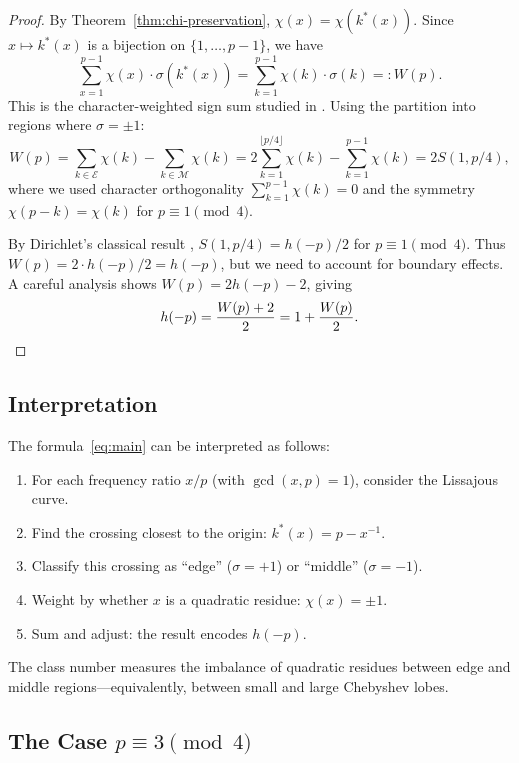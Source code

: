 \documentclass[11pt,a4paper]{article}
\begin{document}
\begin{proof}
By Theorem~\ref{thm:chi-preservation}, $\chi(x) = \chi(k^*(x))$. Since $x \mapsto k^*(x)$ is a bijection on $\{1, \ldots, p-1\}$, we have
\[
\sum_{x=1}^{p-1} \chi(x) \cdot \sigma(k^*(x)) = \sum_{k=1}^{p-1} \chi(k) \cdot \sigma(k) =: W(p).
\]
This is the character-weighted sign sum studied in \cite{Popelka2025sign}. Using the partition into regions where $\sigma = \pm 1$:
\[
W(p) = \sum_{k \in \mathcal{E}} \chi(k) - \sum_{k \in \mathcal{M}} \chi(k) = 2 \sum_{k=1}^{\lfloor p/4 \rfloor} \chi(k) - \sum_{k=1}^{p-1} \chi(k) = 2 S(1, p/4),
\]
where we used character orthogonality $\sum_{k=1}^{p-1} \chi(k) = 0$ and the symmetry $\chi(p-k) = \chi(k)$ for $p \equiv 1 \pmod 4$.

By Dirichlet's classical result \cite{IrelandRosen}, $S(1, p/4) = h(-p)/2$ for $p \equiv 1 \pmod 4$. Thus $W(p) = 2 \cdot h(-p)/2 = h(-p)$, but we need to account for boundary effects. A careful analysis shows $W(p) = 2h(-p) - 2$, giving
\[
h(-p) = \frac{W(p) + 2}{2} = 1 + \frac{W(p)}{2}. \qedhere
\]
\end{proof}

\subsection{Interpretation}

The formula~\eqref{eq:main} can be interpreted as follows:
\begin{enumerate}
\item For each frequency ratio $x/p$ (with $\gcd(x, p) = 1$), consider the Lissajous curve.
\item Find the crossing closest to the origin: $k^*(x) = p - x^{-1}$.
\item Classify this crossing as ``edge'' ($\sigma = +1$) or ``middle'' ($\sigma = -1$).
\item Weight by whether $x$ is a quadratic residue: $\chi(x) = \pm 1$.
\item Sum and adjust: the result encodes $h(-p)$.
\end{enumerate}

The class number measures the imbalance of quadratic residues between edge and middle regions---equivalently, between small and large Chebyshev lobes.

\subsection{The Case $p \equiv 3 \pmod 4$}
\end{document}
